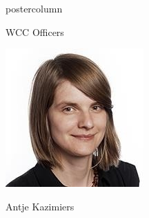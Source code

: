 \documentclass{beamer}
\begin{document}
\begin{frame}
\begin{columns}
\begin{column}{.33\textwidth}
\begin{beamercolorbox}[center,wd=\textwidth]{postercolumn}
\begin{minipage}[T]{.95\textwidth}
{\begin{myblock}{WCC Officers}
\begin{addmargin}[1em]{1em}
\begin{minipage}{0.3\linewidth}
                                \includegraphics[width=\linewidth]{img/antje.jpg}
                                \centerline{Antje Kazimiers}
                            \end{minipage}
                        \end{addmargin}
                        \begin{addmargin}[1em]{1em}
                            \vspace{1.5cm}
                            \begin{minipage}{0.3\linewidth}

\end{minipage}
\end{addmargin}
\end{myblock}}
\end{minipage}
\end{beamercolorbox}
\end{column}
\end{columns}
\end{frame}
\end{document}
